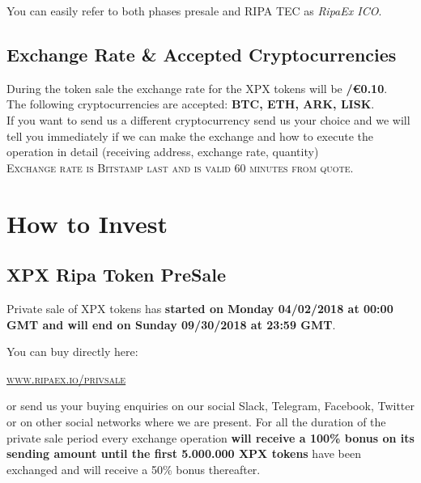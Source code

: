 \documentclass[11pt,fleqn,oneside]{book} %
\begin{document}
You can easily refer to both phases presale and RIPA TEC as \textit{RipaEx ICO}.

\subsection{Exchange Rate \& Accepted Cryptocurrencies}
During the token sale the exchange rate for the XPX tokens will be \textbf{\PHP/\euro0.10}.\\

The following cryptocurrencies are accepted: \textbf{BTC, ETH, ARK, LISK}.\\

If you want to send us a different cryptocurrency send us your choice and we will tell you immediately if we can make 
the exchange and how to execute the operation in detail (receiving address, exchange rate, quantity)\\

\textsc{Exchange rate is Bitstamp last and is valid 60 minutes from quote}.

\section{How to Invest}
\subsection{XPX Ripa Token PreSale}
Private sale of XPX tokens has \textbf{started on Monday 04/02/2018 at 00:00 GMT and will end on Sunday 09/30/2018 at 23:59 GMT}.

You can buy directly here: 
\begin{center}
	\href{https://www.ripaex.io/privsale}{\textsc{www.ripaex.io/privsale}}
\end{center}

or send us your buying enquiries on our social Slack, Telegram, Facebook, Twitter or on other social networks where we are present.
For all the duration of the private sale period every exchange operation \textbf{will receive a 100\% bonus on its sending amount
until the first 5.000.000 XPX tokens} have been exchanged and will receive a 50\% bonus thereafter.
\end{document}

